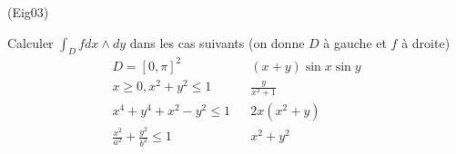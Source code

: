 \begin{tiny}(Eig03)\end{tiny}
Calculer $\int_D f dx\wedge dy$ dans les cas suivants (on donne $D$
  {\`a} gauche et $f$ {\`a} droite)
\begin{align*}
  D=[0,\pi]^2  & & (x+y)\sin x \sin y \\
  x\geq 0, x^2+y^2\leq 1 & & \frac{y}{x^2+1}\\
  x^4+y^4+x^2-y^2\leq 1 & & 2x(x^2+y)\\
  \frac{x^2}{a^2}+\frac{y^2}{b^2}\leq 1 & & x^2+y^2\\
\end{align*}
